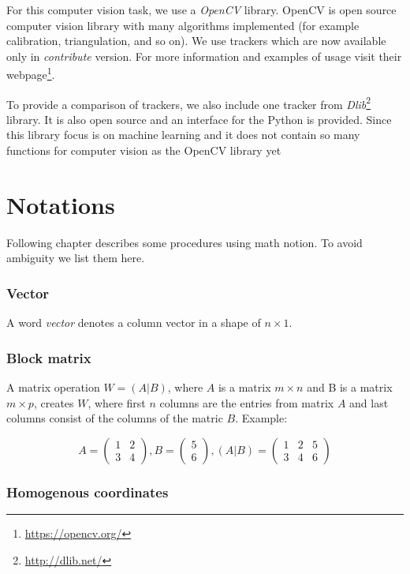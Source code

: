 For this computer vision task, we use a \emph{OpenCV} library. OpenCV is open
source computer vision library with many algorithms implemented (for example
calibration, triangulation, and so on). We use trackers which are now available
only in \emph{contribute} version. For more information and examples of usage
visit their webpage\footnote{\url{https://opencv.org/}}.

To provide a comparison of trackers, we also include one tracker from
\emph{Dlib}\footnote{\url{http://dlib.net/}} library. It is also open source
and an interface for the Python is provided.  Since this library focus is on
machine learning and it does not contain so many functions for computer vision
as the OpenCV library yet

\section{Notations}

Following chapter describes some procedures using math notion. To avoid
ambiguity we list them here.

\subsubsection*{Vector}
A word \emph{vector} denotes a column vector in a shape of $n\times1$.

\subsubsection*{Block matrix}
A matrix operation $W = (A|B)$, where $A$ is a matrix $m \times n$ and B is a
matrix $m \times p$, creates $W$, where first $n$ columns are the entries from
matrix $A$ and last columns consist of the columns of the matric $B$.
Example:

\[
A = \begin{pmatrix}
        1 & 2 \\
        3 & 4
\end{pmatrix},
B = \begin{pmatrix}
5 \\
6
\end{pmatrix},
(A|B) = \begin{pmatrix}
        1 & 2 & 5 \\
        3 & 4 & 6
\end{pmatrix}
\]

\subsubsection*{Homogenous coordinates}

